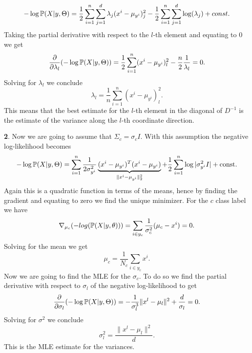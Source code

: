 \documentclass{article}
\begin{document}
\begin{equation*}
- \log \mathbb{P}(X|y,\Theta)=\frac{1}{2}\sum_{i=1}^{n}\sum_{j=1}^{d}\lambda_{j}(x^{i}-\mu_{y^{i}})^{2}_{j}-\frac{1}{2}\sum_{i=1}^{n}\sum_{j=1}^{d}\log(\lambda_{j})+const.
\end{equation*}
Taking the partial derivative with respect to the $l$-th element and equating to $0$ we get
\begin{equation*}
\frac{\partial}{\partial\lambda_{l}}(- \log \mathbb{P}(X|y,\Theta))=\frac{1}{2}\sum_{i=1}^{n}(x^{i}-\mu_{y^{i}})^{2}_{l}-\frac{n}{2}\frac{1}{\lambda_{l}}=0.
\end{equation*}
Solving for $\lambda_{l}$ we conclude
\begin{equation*}
\lambda_{l}=\frac{1}{n}\sum_{i=1}^{n}(x^{i}-\mu_{y^{i}})^{2}_{l}.
\end{equation*}
This means that the best estimate for the $l$-th element in the diagonal of $D^{-1}$ is the estimate of the variance along the $l$-th coordinate direction.
\newline

\textbf{2}. Now we are going to assume that $\Sigma_{c}=\sigma_{c}I$. With this assumption the negative log-likelihood becomes
\begin{equation*}
- \log \mathbb{P}(X|y,\Theta)
 = \sum_{i=1}^n \frac{1}{2\sigma_{y^{i}}^{2}}\underbrace{(x^i - \mu_{y^i})^T(x^i - \mu_{y^i})}_{\|x^{i}-\mu_{y^{i}}\|^{2}_{2}} + \frac 1 2\sum_{i=1}^n \log|\sigma_{y^{i}}^{2}I| + \text{const.}
\end{equation*}
Again this is a quadratic function in terms of the means, hence by finding the gradient and equating to zero we find the unique minimizer. For the $c$ class label we have
\begin{equation*}
\nabla_{\mu_{c}}(-log(\mathbb{P}(X|y,\theta)))=\sum_{i\in y_{c}}\frac{1}{\sigma_{c}^{2}}(\mu_{c}-x^{i})=0.
\end{equation*}
Solving for the mean we get
\begin{equation}\label{eqnmus}
\mu_{c}=\frac{1}{N_{c}}\sum_{i\in y_{c}}x^{i}.
\end{equation}
Now we are going to find the MLE for the $\sigma_{c}$. To do so we find the partial derivative with respect to $\sigma_{l}$ of the negative log-likelihood to get
\begin{equation*}
\frac{\partial }{\partial\sigma_{l}}(- \log \mathbb{P}(X|y,\Theta))=-\frac{1}{\sigma_{l}^{3}}\|x^{l}-\mu_{l}\|^{2}+\frac{d}{\sigma_{l}}=0.
\end{equation*}
Solving for $\sigma^{2}$ we conclude
\begin{equation}\label{eqnsigmas}
\sigma_{l}^{2}=\frac{\|x^{l}-\mu_{l}\|^{2}}{d}.
\end{equation}
This is the MLE estimate for the variances.
\end{document}

